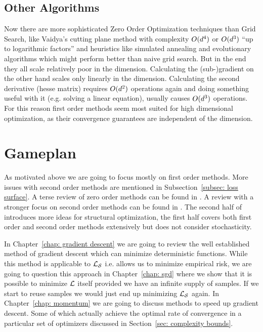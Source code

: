 \subsection{Other Algorithms}

Now there are more sophisticated Zero Order Optimization techniques than Grid
Search, like Vaidya's cutting plane method
\parencite[e.g.][]{bubeckConvexOptimizationAlgorithms2015} with complexity
\(O(d^4)\) or \(O(d^3)\) ``up to logarithmic factors''
\parencite[Section 2.3]{bubeckConvexOptimizationAlgorithms2015} and heuristics
like simulated annealing and evolutionary algorithms which might perform better
than naive grid search. But in the end they all scale relatively poor in the
dimension. Calculating the \mbox{(sub-)gradient} on the other hand scales only
linearly in the dimension. Calculating the second derivative (hesse matrix)
requires \(O(d^2)\) operations again and doing something useful with it
(e.g. solving a linear equation), usually causes \(O(d^3)\)
operations. For this reason first order methods seem most suited for high
dimensional optimization, as their convergence guarantees are independent of
the dimension.

\section{Gameplan}

As motivated above we are going to focus mostly on first order methods. More
issues with second order methods are mentioned in Subsection~\ref{subsec: loss
surface}. A terse review of zero order methods can be found in
\textcite{bubeckConvexOptimizationAlgorithms2015}. A review with a stronger
focus on second order methods can be found in
\textcite{bottouOptimizationMethodsLargeScale2018}. The second half of
\textcite{nesterovLecturesConvexOptimization2018} introduces more ideas for
structural optimization, the first half covers both first order and second
order methods extensively but does not consider stochasticity.

In Chapter~\ref{chap: gradient descent} we are going to review the well
established method of gradient descent which can minimize deterministic
functions. While this method is applicable to \(\mathcal{L}_{\mathcal{S}}\) i.e. allows us to
minimize empirical risk, we are going to question this approach in
Chapter~\ref{chap: sgd} where we show that it is possible to minimize \(\mathcal{L}\)
itself provided we have an infinite supply of samples. If we start to reuse
samples we would just end up minimizing \(\mathcal{L}_{\mathcal{S}}\) again. In
Chapter~\ref{chap: momentum} we are going to discuss methods to speed up
gradient descent. Some of which actually achieve the optimal rate of convergence
in a particular set of optimizers discussed in Section~\ref{sec:
complexity bounds}.



\endinput
